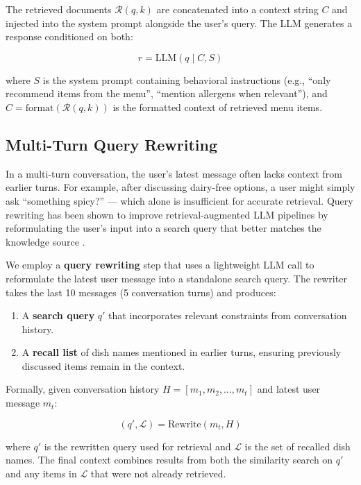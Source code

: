 The retrieved documents $\mathcal{R}(q, k)$ are concatenated into a context string $C$ and injected into the system prompt alongside the user's query. The LLM generates a response conditioned on both:

\begin{equation}\label{eq:generation}
    r = \text{LLM}(q \mid C, S)
\end{equation}

\noindent where $S$ is the system prompt containing behavioral instructions (e.g., ``only recommend items from the menu'', ``mention allergens when relevant''), and $C = \text{format}(\mathcal{R}(q, k))$ is the formatted context of retrieved menu items.

\subsection{Multi-Turn Query Rewriting}

In a multi-turn conversation, the user's latest message often lacks context from earlier turns. For example, after discussing dairy-free options, a user might simply ask ``something spicy?'' --- which alone is insufficient for accurate retrieval. Query rewriting has been shown to improve retrieval-augmented LLM pipelines by reformulating the user's input into a search query that better matches the knowledge source \cite{Ma2023QueryRewriting}.

We employ a \textbf{query rewriting} step that uses a lightweight LLM call to reformulate the latest user message into a standalone search query. The rewriter takes the last 10 messages (5 conversation turns) and produces:

\begin{enumerate}
    \item A \textbf{search query} $q'$ that incorporates relevant constraints from conversation history.
    \item A \textbf{recall list} of dish names mentioned in earlier turns, ensuring previously discussed items remain in the context.
\end{enumerate}

Formally, given conversation history $H = [m_1, m_2, \ldots, m_t]$ and latest user message $m_t$:

\begin{equation}\label{eq:rewrite}
    (q', \mathcal{L}) = \text{Rewrite}(m_t, H)
\end{equation}

\noindent where $q'$ is the rewritten query used for retrieval and $\mathcal{L}$ is the set of recalled dish names. The final context combines results from both the similarity search on $q'$ and any items in $\mathcal{L}$ that were not already retrieved.

